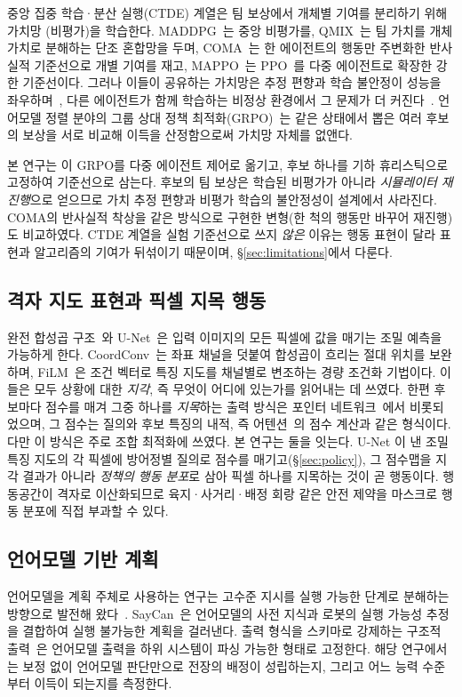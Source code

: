 중앙 집중 학습·분산 실행(CTDE) 계열은 팀 보상에서 개체별 기여를 분리하기 위해 가치망
(비평가)을 학습한다. MADDPG~\citep{lowe2017maddpg}는 중앙 비평가를, QMIX~\citep{rashid2018qmix}는
팀 가치를 개체 가치로 분해하는 단조 혼합망을 두며, COMA~\citep{foerster2018coma}는 한
에이전트의 행동만 주변화한 반사실적 기준선으로 개별 기여를 재고, MAPPO~\citep{yu2022mappo}는
PPO~\citep{schulman2017ppo}를 다중 에이전트로 확장한 강한 기준선이다. 그러나 이들이 공유하는
가치망은 추정 편향과 학습 불안정이 성능을 좌우하며~\citep{haarnoja2018sac}, 다른 에이전트가
함께 학습하는 비정상 환경에서 그 문제가 더 커진다~\citep{lowe2017maddpg}. 언어모델 정렬
분야의 그룹 상대 정책 최적화(GRPO)~\citep{shao2024deepseekmath}는 같은 상태에서 뽑은 여러
후보의 보상을 서로 비교해 이득을 산정함으로써 가치망 자체를 없앤다.

본 연구는 이 GRPO를 다중 에이전트 제어로 옮기고, 후보 하나를 기하 휴리스틱으로 고정하여
기준선으로 삼는다. 후보의 팀 보상은 학습된 비평가가 아니라 \emph{시뮬레이터 재진행}으로
얻으므로 가치 추정 편향과 비평가 학습의 불안정성이 설계에서 사라진다. COMA의 반사실적
착상을 같은 방식으로 구현한 변형(한 척의 행동만 바꾸어 재진행)도 비교하였다. CTDE 계열을 실험
기준선으로 쓰지 \emph{않은} 이유는 행동 표현이 달라 표현과 알고리즘의 기여가 뒤섞이기
때문이며, \S\ref{sec:limitations}에서 다룬다.


\subsection{격자 지도 표현과 픽셀 지목 행동}

완전 합성곱 구조~\citep{long2015fcn}와 U-Net~\citep{ronneberger2015unet}은 입력 이미지의 모든
픽셀에 값을 매기는 조밀 예측을 가능하게 한다. CoordConv~\citep{liu2018coordconv}는 좌표
채널을 덧붙여 합성곱이 흐리는 절대 위치를 보완하며, FiLM~\citep{perez2018film}은 조건
벡터로 특징 지도를 채널별로 변조하는 경량 조건화 기법이다. 이들은 모두 상황에 대한 \emph{지각},
즉 무엇이 어디에 있는가를 읽어내는 데 쓰였다. 한편 후보마다 점수를 매겨 그중 하나를 \emph{지목}하는
출력 방식은 포인터 네트워크~\citep{vinyals2015pointer}에서 비롯되었으며, 그 점수는 질의와
후보 특징의 내적, 즉 어텐션~\citep{vaswani2017attention}의 점수 계산과 같은 형식이다. 다만
이 방식은 주로 조합 최적화에 쓰였다. 본 연구는 둘을 잇는다. U-Net 이 낸 조밀 특징 지도의
각 픽셀에 방어정별 질의로 점수를 매기고(\S\ref{sec:policy}), 그 점수맵을 지각 결과가 아니라
\emph{정책의 행동 분포}로 삼아 픽셀 하나를 지목하는 것이 곧 행동이다. 행동공간이 격자로 이산화되므로
육지·사거리·배정 회랑 같은 안전 제약을 마스크로 행동 분포에 직접 부과할 수 있다.

\subsection{언어모델 기반 계획}

언어모델을 계획 주체로 사용하는 연구는 고수준 지시를 실행 가능한 단계로 분해하는 방향으로
발전해 왔다~\citep{huang2022zeroshot}. SayCan~\citep{ahn2022saycan}은 언어모델의 사전 지식과
로봇의 실행 가능성 추정을 결합하여 실행 불가능한 계획을 걸러낸다. 출력 형식을 스키마로
강제하는 구조적 출력~\citep{openai2026function}은 언어모델 출력을 하위 시스템이 파싱 가능한
형태로 고정한다. 해당 연구에서는 보정 없이 언어모델 판단만으로 전장의 배정이 성립하는지, 그리고 어느 능력 수준부터 이득이 되는지를 측정한다.
